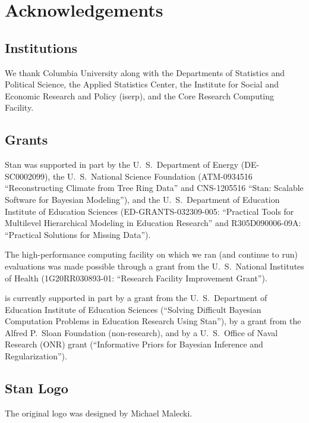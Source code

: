 \chapter*{Acknowledgements}

\section*{Institutions}

We thank Columbia University along with the Departments of
Statistics and Political Science, the Applied Statistics Center, the
Institute for Social and Economic Research and Policy ({\sc iserp}),
and the Core Research Computing Facility.

\section*{Grants}

Stan was supported in part by
%
the U.~S.\ Department of Energy
({\small DE-SC0002099}),
%
the U.~S.\ National Science Foundation
({\small ATM-0934516}
``Reconstructing Climate from Tree Ring Data''
and {\small CNS-1205516} ``Stan: Scalable Software for Bayesian Modeling''),
%
and
the U.~S.\ Department of Education Institute of Education Sciences
({\small ED-GRANTS-032309-005}:
 ``Practical Tools for Multilevel Hierarchical Modeling in Education
 Research'' and
 {\small R305D090006-09A}:
 ``Practical Solutions for Missing Data'').

The high-performance computing facility on which we ran (and continue
to run) evaluations was made possible through a grant from the U.~S.\
National Institutes of Health ({\small 1G20RR030893-01}: ``Research
Facility Improvement Grant'').

\Stan is currently supported in part by a grant from the U.~S.\
Department of Education Institute of Education Sciences (``Solving
Difficult Bayesian Computation Problems in Education Research Using
Stan''), by a grant from the Alfred P.\ Sloan Foundation
(non-research), and by a U.~S.\ Office of Naval Research (ONR) grant
(``Informative Priors for Bayesian Inference and Regularization'').
%


\section*{Stan Logo}

The original logo was designed by Michael Malecki.

